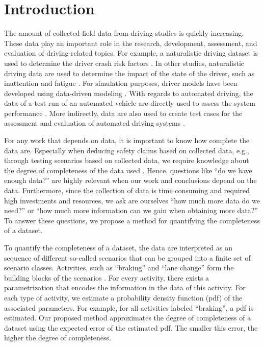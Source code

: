 \section{Introduction}
\label{sec:introduction}

The amount of collected field data from driving studies is quickly increasing. These data play an important role in the research, development, assessment, and evaluation of driving-related topics. For example, a naturalistic driving dataset is used to determine the driver crash risk factors \cite{dingus2016crashrisk}. In other studies, naturalistic driving data are used to determine the impact of the state of the driver, such as inattention \cite{klauer2006impact} and fatigue \cite{williamson2011link}. For simulation purposes, driver models have been developed using data-driven modeling \cite{sadigh2014data}. With regards to automated driving, the data of a test run of an automated vehicle are directly used to assess the system performance \cite{broggi2013extensive}. More indirectly, data are also used to create test cases for the assessment and evaluation of automated driving systems \cite{zofka2015datadrivetrafficscenarios, elrofai2018scenario, deGelder2017assessment, ploeg2018cetran, putz2017pegasus, krajewski2018highD}.

For any work that depends on data, it is important to know how complete the data are. Especially when deducing safety claims based on collected data, e.g., through testing scenarios based on collected data, we require knowledge about the degree of completeness of the data used \cite{geyer2014, stellet2015taxonomy, alvarez2017prospective}. Hence, questions like ``do we have enough data?'' are highly relevant when our work and conclusions depend on the data. Furthermore, since the collection of data is time consuming and required high investments and resources, we ask are ourselves ``how much more data do we need?'' or ``how much more information can we gain when obtaining more data?'' To answer these questions, we propose a method for quantifying the completeness of a dataset. 

To quantify the completeness of a dataset, the data are interpreted as an sequence of different so-called scenarios that can be grouped into a finite set of scenario classes. Activities, such as ``braking'' and ``lane change'' form the building blocks of the scenarios \cite{elrofai2018scenario}. For every activity, there exists a parametrization that encodes the information in the data of this activity. For each type of activity, we estimate a probability density function (pdf) of the associated parameters. For example, for all activities labeled ``braking'', a pdf is estimated. Our proposed method approximates the degree of completeness of a dataset using the expected error of the estimated pdf. The smaller this error, the higher the degree of completeness.

